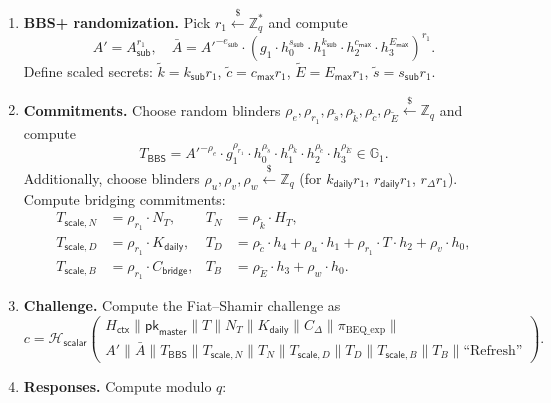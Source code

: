 \documentclass[11pt]{article}
\theoremstyle{definitionstyle}
\theoremstyle{plain}
\begin{document}
\begin{enumerate}[leftmargin=*]
\item \textbf{BBS+ randomization.}
  Pick $r_1 \xleftarrow{\$} \mathbb{Z}_q^*$ and compute
  \[
  A' = A_{\mathsf{sub}}^{r_1}, \quad
  \bar{A} = A'^{-e_{\mathsf{sub}}} \cdot \left( g_1 \cdot h_0^{s_{\mathsf{sub}}} \cdot h_1^{k_{\mathsf{sub}}} \cdot h_2^{c_{\mathsf{max}}} \cdot h_3^{E_{\mathsf{max}}} \right)^{r_1}.
  \]
  Define scaled secrets: $\tilde{k} = k_{\mathsf{sub}} r_1$, $\tilde{c} = c_{\mathsf{max}} r_1$, $\tilde{E} = E_{\mathsf{max}} r_1$, $\tilde{s} = s_{\mathsf{sub}} r_1$.
\item \textbf{Commitments.}
  Choose random blinders $\rho_e, \rho_{r_1}, \rho_{\tilde{s}}, \rho_{\tilde{k}}, \rho_{\tilde{c}}, \rho_{\tilde{E}} \xleftarrow{\$} \mathbb{Z}_q$ and compute
  \[
  T_{\mathsf{BBS}} = A'^{-\rho_e} \cdot g_1^{\rho_{r_1}} \cdot h_0^{\rho_{\tilde{s}}} \cdot h_1^{\rho_{\tilde{k}}} \cdot h_2^{\rho_{\tilde{c}}} \cdot h_3^{\rho_{\tilde{E}}} \in \mathbb{G}_1.
  \]
  Additionally, choose blinders $\rho_u, \rho_v, \rho_w \xleftarrow{\$} \mathbb{Z}_q$ (for $k_{\mathsf{daily}} r_1$, $r_{\mathsf{daily}} r_1$, $r_{\Delta} r_1$).
  Compute bridging commitments:
  \begin{align*}
    T_{\mathsf{scale},N} &= \rho_{r_1} \cdot N_T, & T_N &= \rho_{\tilde{k}} \cdot H_T, \\
    T_{\mathsf{scale},D} &= \rho_{r_1} \cdot K_{\mathsf{daily}}, & T_D &= \rho_{\tilde{c}} \cdot h_4 + \rho_u \cdot h_1 + \rho_{r_1} \cdot T \cdot h_2 + \rho_v \cdot h_0, \\
    T_{\mathsf{scale},B} &= \rho_{r_1} \cdot C_{\mathsf{bridge}}, & T_B &= \rho_{\tilde{E}} \cdot h_3 + \rho_w \cdot h_0.
  \end{align*}
\item \textbf{Challenge.}
  Compute the Fiat--Shamir challenge as
  \[
  c = \mathcal{H}_{\mathsf{scalar}}\left(
  \begin{array}{c}
  H_{\mathsf{ctx}} \parallel \mathsf{pk}_{\mathsf{master}} \parallel T \parallel N_T \parallel K_{\mathsf{daily}} \parallel C_{\Delta} \parallel \pi_{\text{BEQ\_exp}} \parallel \\
  A' \parallel \bar{A} \parallel T_{\mathsf{BBS}} \parallel T_{\mathsf{scale},N} \parallel T_N \parallel T_{\mathsf{scale},D} \parallel T_D \parallel T_{\mathsf{scale},B} \parallel T_B \parallel \text{``Refresh''}
  \end{array}
  \right).
  \]
\item \textbf{Responses.}
  Compute modulo $q$:

\end{enumerate}
\end{document}
